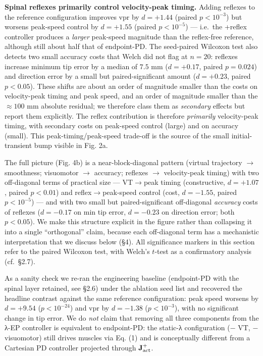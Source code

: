 \documentclass[
  11pt,
]{article}
\begin{document}
\textbf{Spinal reflexes primarily control velocity-peak timing.} Adding
reflexes to the reference configuration improves vpr by \(d = +1.44\)
(paired \(p < 10^{-3}\)) but worsens peak-speed control by \(d = +1.55\)
(paired \(p < 10^{-5}\)) --- i.e.~the +reflex controller produces a
\emph{larger} peak-speed magnitude than the reflex-free reference,
although still about half that of endpoint-PD. The seed-paired Wilcoxon
test also detects two small accuracy costs that Welch did not flag at
\(n = 20\): reflexes increase minimum tip error by a median of \(7.5\)
mm (\(d = +0.17\), paired \(p = 0.024\)) and direction error by a small
but paired-significant amount (\(d = +0.23\), paired \(p < 0.05\)).
These shifts are about an order of magnitude smaller than the costs on
velocity-peak timing and peak speed, and an order of magnitude smaller
than the \(\approx 100\) mm absolute residual; we therefore class them
as \emph{secondary} effects but report them explicitly. The reflex
contribution is therefore \emph{primarily} velocity-peak timing, with
secondary costs on peak-speed control (large) and on accuracy (small).
This peak-timing/peak-speed trade-off is the source of the small
initial-transient bump visible in Fig. 2a.

The full picture (Fig. 4b) is a near-block-diagonal pattern (virtual
trajectory \(\to\) smoothness; visuomotor \(\to\) accuracy; reflexes
\(\to\) velocity-peak timing) with two off-diagonal terms of practical
size --- VT\(\to\)peak timing (constructive, \(d = +1.07\), paired
\(p < 0.01\)) and reflex\(\to\)peak-speed control (cost, \(d = -1.55\),
paired \(p < 10^{-5}\)) --- and with two small but paired-significant
off-diagonal \emph{accuracy} costs of reflexes (\(d = -0.17\) on min tip
error, \(d = -0.23\) on direction error; both \(p < 0.05\)). We make
this structure explicit in the figure rather than collapsing it into a
single ``orthogonal'' claim, because each off-diagonal term has a
mechanistic interpretation that we discuss below (§4). All significance
markers in this section refer to the paired Wilcoxon test, with Welch's
\(t\)-test as a confirmatory analysis (cf.~§2.7).

As a sanity check we re-ran the engineering baseline (endpoint-PD with
the spinal layer retained, see §2.6) under the ablation seed list and
recovered the headline contrast against the same reference
configuration: peak speed worsens by \(d = +9.54\) (\(p < 10^{-24}\))
and vpr by \(d = -1.38\) (\(p < 10^{-3}\)), with no significant change
in tip error. We do \emph{not} claim that removing all three components
from the λ-EP controller is equivalent to endpoint-PD: the static-λ
configuration (− VT, − visuomotor) still drives muscles via Eq. (1) and
is conceptually different from a Cartesian PD controller projected
through \(\mathbf{J}_{\rm act}^{+}\).
\end{document}
